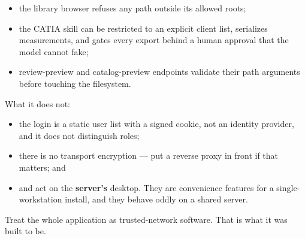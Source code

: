 \begin{itemize}
\item the library browser refuses any path outside its allowed roots;
\item the CATIA skill can be restricted to an explicit client list, serializes
measurements, and gates every export behind a human approval that the model
cannot fake;
\item review-preview and catalog-preview endpoints validate their path arguments
before touching the filesystem.
\end{itemize}

What it does not:

\begin{itemize}
\item the login is a static user list with a signed cookie, not an identity
provider, and it does not distinguish roles;
\item there is no transport encryption --- put a reverse proxy in front if that
matters; and
\item {} and
 act on the \textbf{server's}
desktop. They are convenience features for a single-workstation install, and
they behave oddly on a shared server.
\end{itemize}

Treat the whole application as trusted-network software. That is what it was
built to be.
